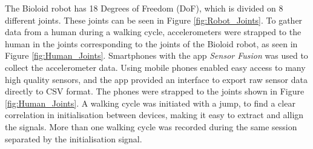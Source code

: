 The Bioloid robot has 18 Degrees of Freedom (DoF), which is divided on 8 different joints. These joints can be seen in Figure \ref{fig:Robot_Joints}. To gather data from a human during a walking cycle, accelerometers were strapped to the human in the joints corresponding to the joints of the Bioloid robot, as seen in Figure \ref{fig:Human_Joints}. Smartphones with the app \textit{Sensor Fusion} \cite{sensorfusion} was used to collect the accelerometer data. Using mobile phones enabled easy access to many high quality sensors, and the app provided an interface to export raw sensor data directly to CSV format. The phones were strapped to the joints shown in Figure \ref{fig:Human_Joints}. A walking cycle was initiated with a jump, to find a clear correlation in initialisation between devices, making it easy to extract and allign the signals. More than one walking cycle was recorded during the same session separated by the initialisation signal.

